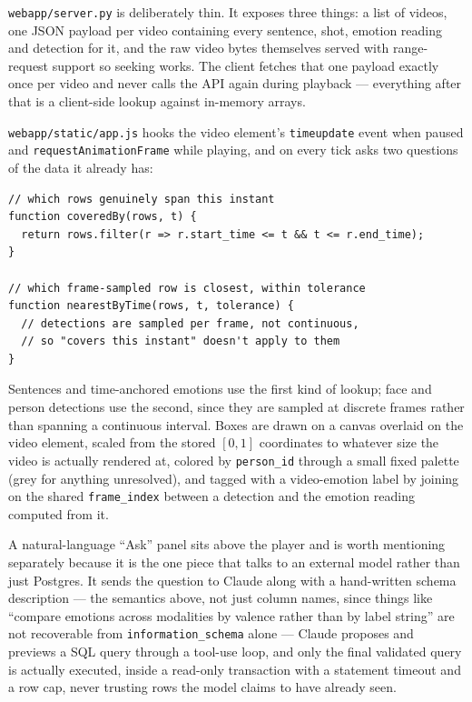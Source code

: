 \documentclass[11pt]{article}
\begin{document}
\texttt{webapp/server.py} is deliberately thin. It exposes three things: a
list of videos, one JSON payload per video containing every sentence, shot,
emotion reading and detection for it, and the raw video bytes themselves
served with range-request support so seeking works. The client fetches that
one payload exactly once per video and never calls the API again during
playback --- everything after that is a client-side lookup against
in-memory arrays.

\texttt{webapp/static/app.js} hooks the video element's \texttt{timeupdate}
event when paused and \texttt{requestAnimationFrame} while playing, and on
every tick asks two questions of the data it already has:

\begin{lstlisting}
// which rows genuinely span this instant
function coveredBy(rows, t) {
  return rows.filter(r => r.start_time <= t && t <= r.end_time);
}

// which frame-sampled row is closest, within tolerance
function nearestByTime(rows, t, tolerance) {
  // detections are sampled per frame, not continuous,
  // so "covers this instant" doesn't apply to them
}
\end{lstlisting}

Sentences and time-anchored emotions use the first kind of lookup; face and
person detections use the second, since they are sampled at discrete frames
rather than spanning a continuous interval. Boxes are drawn on a canvas
overlaid on the video element, scaled from the stored $[0,1]$ coordinates to
whatever size the video is actually rendered at, colored by
\texttt{person\_id} through a small fixed palette (grey for anything
unresolved), and tagged with a video-emotion label by joining on the shared
\texttt{frame\_index} between a detection and the emotion reading computed
from it.

A natural-language ``Ask'' panel sits above the player and is worth
mentioning separately because it is the one piece that talks to an external
model rather than just Postgres. It sends the question to Claude along with
a hand-written schema description --- the semantics above, not just column
names, since things like ``compare emotions across modalities by valence
rather than by label string'' are not recoverable from
\texttt{information\_schema} alone --- Claude proposes and previews a SQL
query through a tool-use loop, and only the final validated query is
actually executed, inside a read-only transaction with a statement timeout
and a row cap, never trusting rows the model claims to have already seen.
\end{document}
